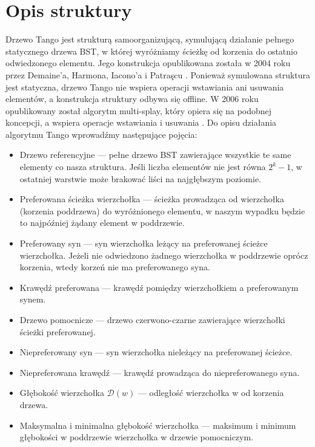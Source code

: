 \documentclass[declaration,shortabstract]{iithesis}
\theoremstyle{thm}
\theoremstyle{remark}
\theoremstyle{plain}
\theoremstyle{plain}
\theoremstyle{plain}
\begin{document}
 \section{Opis struktury} 
Drzewo Tango jest strukturą samoorganizującą, symulującą działanie pełnego statycznego drzewa BST, w której wyróżniamy ścieżkę od korzenia do ostatnio odwiedzonego elementu. 
Jego konstrukcja opublikowana została w 2004 roku przez  Demaine'a, Harmona, Iacono'a i Patraşcu \cite{DBLP:journals/siamcomp/DemaineHIP07}. Ponieważ symulowana struktura jest statyczna, drzewo Tango nie wspiera operacji wstawiania ani usuwania elementów, a konstrukcja struktury odbywa się offline. W 2006 roku opublikowany został algorytm multi-splay, który opiera się na podobnej koncepcji, a wspiera operacje wstawiania i usuwania \cite{DBLP:conf/soda/WangDS06}. Do opisu działania algorytmu Tango wprowadźmy następujące pojęcia: 
 \begin{itemize} 
 \item{Drzewo referencyjne --- pełne drzewo BST zawierające wszystkie te same elementy co nasza struktura. Jeśli liczba elementów nie jest równa \(2^k -1\), w ostatniej warstwie może brakować liści na najgłębszym poziomie.} 
 \item{Preferowana ścieżka wierzchołka --- ścieżka prowadząca od wierzchołka (korzenia poddrzewa) do wyróżnionego elementu, w naszym wypadku będzie to najpóźniej  żądany element w poddrzewie.} 
 \item{Preferowany syn --- syn wierzchołka leżący na preferowanej ścieżce wierzchołka. Jeżeli nie odwiedzono żadnego wierzchołka w poddrzewie oprócz korzenia, wtedy korzeń nie ma preferowanego syna.} 
 \item{Krawędź preferowana --- krawędź pomiędzy wierzchołkiem a preferowanym synem.} 
 \item{Drzewo pomocnicze --- drzewo czerwono-czarne \cite{Cormen:2009:IAT:1614191} zawierające wierzchołki ścieżki preferowanej.} 
 \item{Niepreferowany syn --- syn wierzchołka nieleżący na preferowanej ścieżce.} 
 \item{Niepreferowana krawędź --- krawędź prowadząca do niepreferowanego syna.} 
 \item{Głębokość wierzchołka \(\mathcal{D}(w)\) --- odległość wierzchołka w od korzenia drzewa.} 
 \item{Maksymalna i minimalna głębokość wierzchołka --- maksimum i minimum głębokości w poddrzewie wierzchołka w drzewie pomocniczym.} 
 \end{itemize} 
\end{document}
